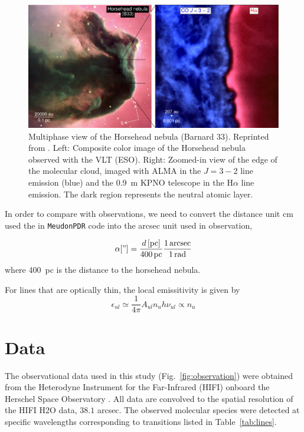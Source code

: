 \documentclass[12pt,a4paper]{article}
\newcommand{\mdpdr}{\texttt{MeudonPDR} code}
\begin{document}
\begin{figure}
    \centering
    \includegraphics[width=\textwidth,keepaspectratio]{horsehead_HernandezVera2023.pdf}
    \caption{Multiphase view of the Horsehead nebula (Barnard 33). Reprinted from \textcite{HernándezVera2023}. Left: Composite color image of the Horsehead nebula observed with the VLT (ESO). Right: Zoomed-in view of the edge of the molecular cloud, imaged with ALMA in the  $J = 3-2$ line emission (blue) and the \qty{0.9}{m} KPNO telescope in the H$\alpha$ line emission. The dark region represents the neutral atomic layer.} \label{fig:obsimg}
\end{figure}

In order to compare with observations, we need to convert the distance unit \unit{cm} used the in \mdpdr{} into the \unit{arcsec} unit used in observation,

\begin{equation}
    \alpha["] = \frac{d\,[\unit{pc}]}{400\,\unit{pc}} \frac{1\,\unit{arcsec}}{1\,\unit{rad}}\textbf{}
\end{equation}
where \qty{400}{pc} \parencite{Menten2007, Schlafly2014} is the distance to the horsehead nebula.

For lines that are optically thin, the local emissitivity is given by
\begin{equation}
    \epsilon_{ul} \simeq \frac{1}{4\pi}A_{ul}n_u h\nu_{ul} \propto n_u
\end{equation}

\section{Data}
The observational data used in this study (Fig.~\ref{fig:observation}) were obtained from the Heterodyne Instrument for the Far-Infrared (HIFI) \parencite{deGraauw2010} onboard the Herschel Space Observatory \parencite{Pilbratt2010}. All data are convolved to the spatial resolution of the HIFI H2O data, $38.1$ arcsec. The observed molecular species were detected at specific wavelengths corresponding to transitions listed in Table~\ref{tab:lines}. 
\end{document}
